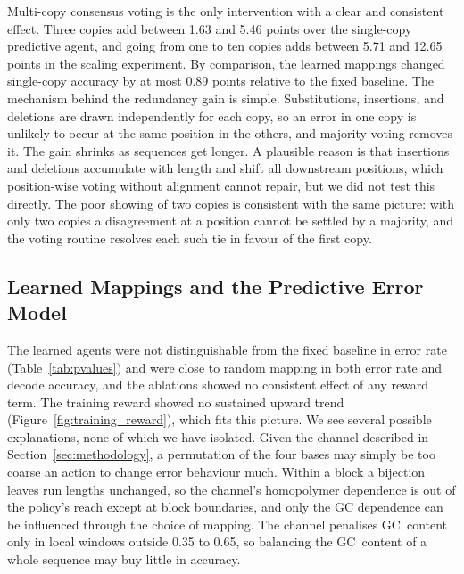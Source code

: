 \documentclass[entropy,article,submit,moreauthors]{Definitions/mdpi}
\begin{document}
Multi-copy consensus voting is the only intervention with a clear and consistent effect. Three copies add between 1.63 and 5.46 points over the single-copy predictive agent, and going from one to ten copies adds between 5.71 and 12.65 points in the scaling experiment. By comparison, the learned mappings changed single-copy accuracy by at most 0.89 points relative to the fixed baseline. The mechanism behind the redundancy gain is simple. Substitutions, insertions, and deletions are drawn independently for each copy, so an error in one copy is unlikely to occur at the same position in the others, and majority voting removes it. The gain shrinks as sequences get longer. A plausible reason is that insertions and deletions accumulate with length and shift all downstream positions, which position-wise voting without alignment cannot repair, but we did not test this directly. The poor showing of two copies is consistent with the same picture: with only two copies a disagreement at a position cannot be settled by a majority, and the voting routine resolves each such tie in favour of the first copy.

\subsection{Learned Mappings and the Predictive Error Model}

The learned agents were not distinguishable from the fixed baseline in error rate (Table~\ref{tab:pvalues}) and were close to random mapping in both error rate and decode accuracy, and the ablations showed no consistent effect of any reward term. The training reward showed no sustained upward trend (Figure~\ref{fig:training_reward}), which fits this picture. We see several possible explanations, none of which we have isolated. Given the channel described in Section~\ref{sec:methodology}, a permutation of the four bases may simply be too coarse an action to change error behaviour much. Within a block a bijection leaves run lengths unchanged, so the channel's homopolymer dependence is out of the policy's reach except at block boundaries, and only the GC dependence can be influenced through the choice of mapping. The channel penalises GC~content only in local windows outside 0.35 to 0.65, so balancing the GC~content of a whole sequence may buy little in accuracy.
\end{document}
